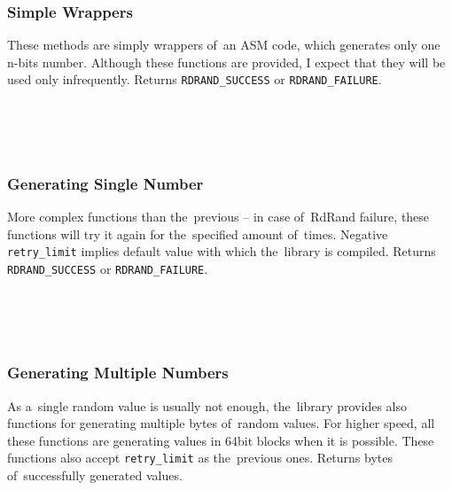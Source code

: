 \subsubsection{Simple Wrappers}\label{subsec:api:simple-wrappers}
\par{
These methods are simply wrappers of~an ASM code, which generates only one n-bits number. Although these functions are provided, I expect that they will be used only infrequently. Returns {\tt RDRAND\_SUCCESS} or {\tt RDRAND\_FAILURE}.\\
}

\\

\\

\\

\subsubsection{Generating Single Number}\label{subsec:api:single-number}
\par{
More complex functions than the~previous -- in case of~RdRand failure, these functions will try it again for the~specified amount of~times. Negative {\tt retry\_limit} implies default value with which the~library is compiled. Returns {\tt RDRAND\_SUCCESS} or {\tt RDRAND\_FAILURE}.\\
}

\\

\\

\\

\subsubsection{Generating Multiple Numbers}\label{subsec:api:multiple}
\par{
As a~single random value is usually not enough, the~library provides also functions for generating multiple bytes of~random values. For higher speed, all these functions are generating values in 64bit blocks when it is possible.
These functions also accept {\tt retry\_limit} as the~previous ones. Returns bytes of~successfully generated values.\\
}

